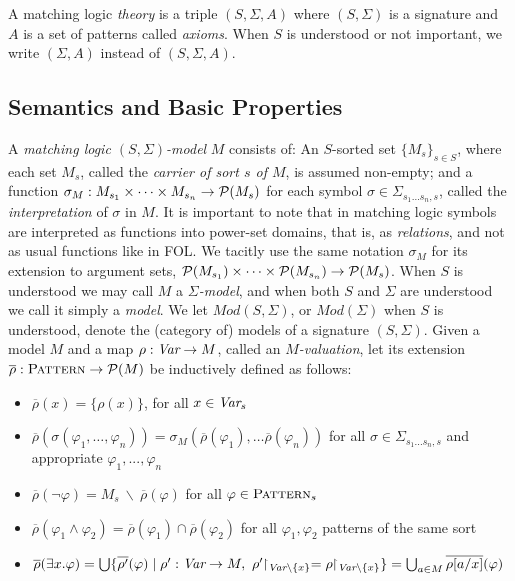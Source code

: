 \documentclass[UTF8,11pt]{article}
\theoremstyle{plain}
\theoremstyle{definition}
\theoremstyle{remark}
\newcommand{\Mod}{\textit{Mod}}
\newcommand{\Pattern}{\textsc{Pattern}\xspace}
\begin{document}
A matching logic \emph{theory} is a triple $(S, \Sigma, A)$ where
$(S,\Sigma)$ is a signature and $A$ is a set of patterns called \emph{axioms}.
When $S$ is understood or not important, we write $(\Sigma,A)$ instead of $(S,\Sigma,A)$.

\subsection{Semantics and Basic Properties}
\label{sec:semantics}

A \emph{matching logic $(S,\Sigma)$-model} $M$ consists of:
An $S$-sorted set $\{M_s\}_{s\in S}$, where each set $M_s$,
called the \emph{carrier of sort $s$ of $M$}, is assumed
non-empty; and a function
$\sigma_M:M_{s_1}\times\cdots\times M_{s_n} \rightarrow {\cal P}(M_s)$
for each symbol $\sigma\in\Sigma_{s_1\ldots s_n,s}$, called the
\emph{interpretation} of $\sigma$ in $M$.
It is important to note that in matching logic symbols are interpreted as
functions into power-set domains, that is, as \emph{relations}, and not as
usual functions like in FOL.
We tacitly use the same notation $\sigma_M$ for its extension
to argument sets,
${\cal P}(M_{s_1})\times\cdots\times {\cal P}(M_{s_n}) \rightarrow {\cal P}(M_s)$.
When $S$ is understood we may call $M$ a \emph{$\Sigma$-model}, and when
both $S$ and $\Sigma$ are understood we call it simply a \emph{model}.
We let $\Mod(S,\Sigma)$, or $\Mod(\Sigma)$ when $S$ is understood, denote
the (category of) models of a signature $(S,\Sigma)$.
%
Given a model $M$ and a map
$\rho:\textit{Var}\rightarrow M$, called an \emph{$M$-valuation}, let its extension
$\overline{\rho}:\Pattern\rightarrow{\cal P}(M)$
be inductively defined as follows:\vspace*{-2ex}
\begin{itemize}\itemsep-1ex
\item $\overline{\rho}(x) = \{\rho(x)\}$, for all $x\in\textit{Var}_s$
\item $\overline{\rho}(\sigma(\varphi_{1},\ldots,\varphi_{n}))=
\sigma_M(\overline{\rho}(\varphi_1),\ldots \overline{\rho}(\varphi_n))$ for all
$\sigma\in\Sigma_{s_1...s_n,s}$ and appropriate $\varphi_1,...,\varphi_n$
\item $\overline{\rho}(\neg\varphi) = M_s \ \backslash\ \overline{\rho}(\varphi)$ for all
$\varphi\in\Pattern_s$
\item $\overline{\rho}(\varphi_1 \wedge \varphi_2) =
\overline{\rho}(\varphi_1) \cap \overline{\rho}(\varphi_2)$
for all $\varphi_1, \varphi_2$ patterns of the same sort
\item $\overline{\rho}(\exists x . \varphi) =
\bigcup\{\overline{\rho'}(\varphi) \mid \rho':\Var\rightarrow M,\ 
\rho'\!\!\upharpoonright_{\Var\backslash\{x\}} =
\rho\!\!\upharpoonright_{\Var\backslash\{x\}}\}
= \bigcup_{a\in M} \overline{\rho[a/x]}(\varphi)
$
\end{itemize}\vspace*{-.5ex}
\end{document}
